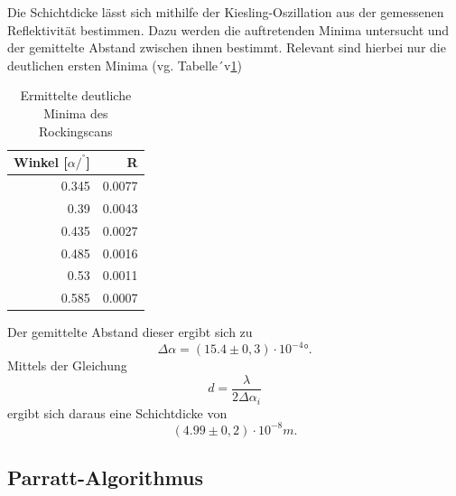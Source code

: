 Die Schichtdicke lässt sich mithilfe der Kiesling-Oszillation aus der gemessenen Reflektivität bestimmen.
Dazu werden die auftretenden Minima untersucht und der gemittelte Abstand zwischen ihnen bestimmt.
Relevant sind hierbei nur die deutlichen ersten Minima (vg. Tabelle´v\ref{tab:scan})
\begin{table}
    \centering
    \caption{Ermittelte deutliche Minima des Rockingscans} 
    \label{tab:scan}
    \begin{tabular}{ r | r}
        \hline			
        Winkel [$\alpha/^°$] & R \\
        \hline
        0.345  & 0.0077  \\
        0.39   & 0.0043  \\
        0.435  & 0.0027  \\
        0.485  & 0.0016  \\
        0.53   & 0.0011  \\
        0.585  & 0.0007  \\
    \hline  
  \end{tabular}
\end{table}

Der gemittelte Abstand dieser ergibt sich zu
\begin{equation}
    \Delta\alpha = (15.4 \pm 0,3)\cdot10^{-4}°.
\end{equation}
Mittels der Gleichung
\begin{equation}
    d = \frac{\lambda}{2\Delta\alpha_i}
\end{equation}
ergibt sich daraus eine Schichtdicke von
\begin{equation}
    (4.99 \pm 0,2)\cdot 10^{-8} m.
\end{equation}


\subsection{Parratt-Algorithmus}

